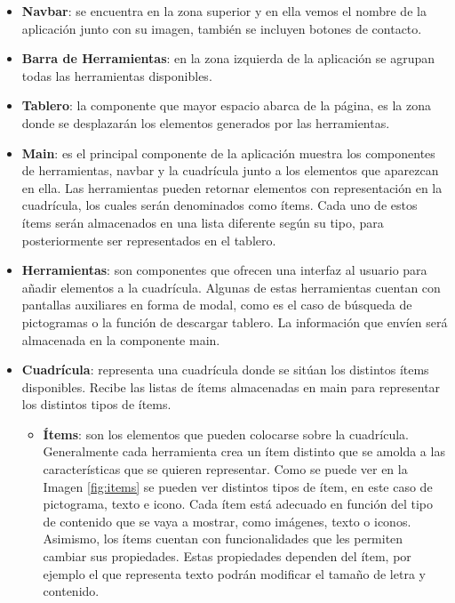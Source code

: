 \begin{itemize}
	\item \textbf{Navbar}: se encuentra en la zona superior y en ella vemos el nombre de la aplicación junto con su imagen, también se incluyen botones de contacto.
	
	
	\item \textbf{Barra de Herramientas}: en la zona izquierda de la aplicación se agrupan todas las herramientas disponibles.
	
	\item \textbf{Tablero}: la componente que mayor espacio abarca de la página, es la zona donde se desplazarán los elementos generados por las herramientas. 	
	
\end{itemize}

\begin{itemize}
	\item \textbf{Main}: es el principal componente de la aplicación muestra los componentes de herramientas, navbar y la cuadrícula junto a los elementos que aparezcan en ella. Las herramientas pueden retornar elementos con representación en la cuadrícula, los cuales serán denominados como ítems. Cada uno de estos ítems serán almacenados en una lista diferente según su tipo, para posteriormente ser representados en el tablero.
	
	
	\item \textbf{Herramientas}: son componentes que ofrecen una interfaz al usuario para añadir elementos a la cuadrícula. Algunas de estas herramientas cuentan con pantallas auxiliares en forma de modal, como es el caso de búsqueda de pictogramas o la función de descargar tablero. La información que envíen será almacenada en la componente main. 
	
	\item \textbf{Cuadrícula}: representa una cuadrícula donde se sitúan los distintos ítems disponibles. Recibe las listas de ítems almacenadas en main para representar los distintos tipos de ítems. 
	\begin{itemize}
		\item \textbf{Ítems}: son los elementos que pueden colocarse sobre la cuadrícula. Generalmente cada herramienta crea un ítem distinto que se amolda a las características que se quieren representar. Como se puede ver en la Imagen \ref{fig:items} se pueden ver distintos tipos de ítem, en este caso de pictograma, texto e icono. Cada ítem está adecuado en función del tipo de contenido que se vaya a mostrar, como imágenes, texto o iconos. Asimismo, los ítems cuentan con funcionalidades que les permiten cambiar sus propiedades. Estas propiedades dependen del ítem, por ejemplo el que representa texto podrán modificar el tamaño de letra y contenido.
		

\end{itemize}
\end{itemize}
